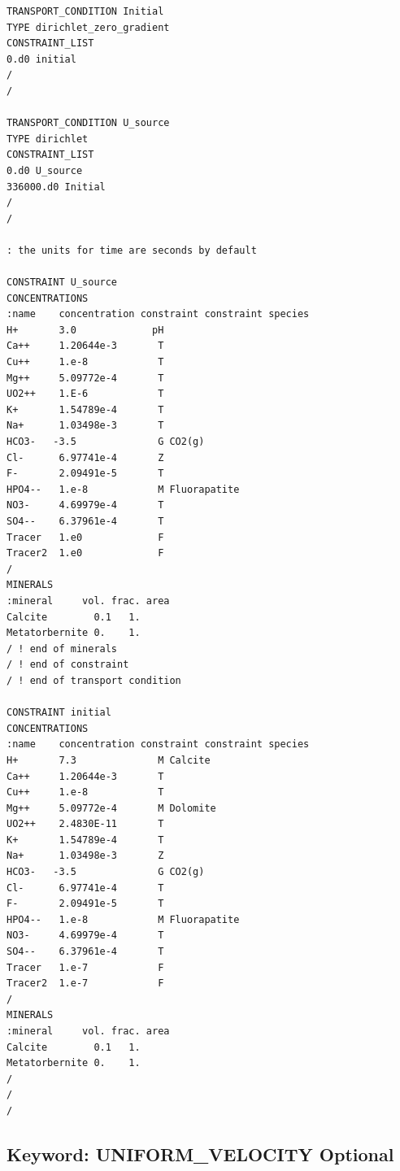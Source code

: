 \documentclass[12pt]{article}
\begin{document}


\begin{verbatim}
TRANSPORT_CONDITION Initial
TYPE dirichlet_zero_gradient
CONSTRAINT_LIST
0.d0 initial
/
/

TRANSPORT_CONDITION U_source
TYPE dirichlet
CONSTRAINT_LIST
0.d0 U_source
336000.d0 Initial
/
/

: the units for time are seconds by default

CONSTRAINT U_source
CONCENTRATIONS
:name    concentration constraint constraint species
H+       3.0             pH
Ca++     1.20644e-3       T
Cu++     1.e-8            T
Mg++     5.09772e-4       T
UO2++    1.E-6            T
K+       1.54789e-4       T
Na+      1.03498e-3       T
HCO3-   -3.5              G CO2(g)
Cl-      6.97741e-4       Z
F-       2.09491e-5       T
HPO4--   1.e-8            M Fluorapatite
NO3-     4.69979e-4       T
SO4--    6.37961e-4       T
Tracer   1.e0             F
Tracer2  1.e0             F
/
MINERALS
:mineral     vol. frac. area
Calcite        0.1   1.
Metatorbernite 0.    1.
/ ! end of minerals
/ ! end of constraint
/ ! end of transport condition

CONSTRAINT initial
CONCENTRATIONS
:name    concentration constraint constraint species
H+       7.3              M Calcite
Ca++     1.20644e-3       T
Cu++     1.e-8            T
Mg++     5.09772e-4       M Dolomite
UO2++    2.4830E-11       T
K+       1.54789e-4       T
Na+      1.03498e-3       Z
HCO3-   -3.5              G CO2(g)
Cl-      6.97741e-4       T
F-       2.09491e-5       T
HPO4--   1.e-8            M Fluorapatite
NO3-     4.69979e-4       T
SO4--    6.37961e-4       T
Tracer   1.e-7            F
Tracer2  1.e-7            F
/
MINERALS
:mineral     vol. frac. area
Calcite        0.1   1.
Metatorbernite 0.    1.
/
/
/
\end{verbatim}


\newpage
\protect\hypertarget{target_unifvel}{}

\subsection{Keyword: UNIFORM\_VELOCITY \hfill Optional}

\end{document}
